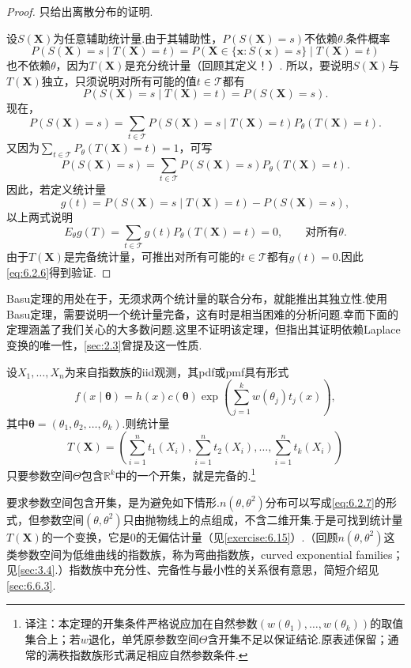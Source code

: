 \begin{proof}
只给出离散分布的证明.

设$S(\boldsymbol X)$为任意辅助统计量.由于其辅助性，$P(S(\boldsymbol X)=s)$不依赖$\theta$.条件概率
$$P(S(\boldsymbol X)=s\mid T(\boldsymbol X)=t)=P(\boldsymbol X\in\{\boldsymbol x:S(\boldsymbol x)=s\}\mid T(\boldsymbol X)=t)$$
也不依赖$\theta$，因为$T(\boldsymbol X)$是充分统计量（回顾其定义！）.
所以，要说明$S(\boldsymbol X)$与$T(\boldsymbol X)$独立，只须说明对所有可能的值$t\in\mathcal T$都有
\begin{equation}\label{eq:6.2.6}
P(S(\boldsymbol X)=s\mid T(\boldsymbol X)=t)=P(S(\boldsymbol X)=s).
\end{equation}
现在，
$$P(S(\boldsymbol X)=s)=\sum_{t\in\mathcal T}P(S(\boldsymbol X)=s\mid T(\boldsymbol X)=t)P_\theta(T(\boldsymbol X)=t).$$
又因为$\sum_{t\in\mathcal T}P_\theta(T(\boldsymbol X)=t)=1$，可写
$$P(S(\boldsymbol X)=s)=\sum_{t\in\mathcal T}P(S(\boldsymbol X)=s)P_\theta(T(\boldsymbol X)=t).$$
因此，若定义统计量
$$g(t)=P(S(\boldsymbol X)=s\mid T(\boldsymbol X)=t)-P(S(\boldsymbol X)=s),$$
以上两式说明
$$E_\theta g(T)=\sum_{t\in\mathcal T}g(t)P_\theta(T(\boldsymbol X)=t)=0,\qquad\text{对所有$\theta$}.$$
由于$T(\boldsymbol X)$是完备统计量，可推出对所有可能的$t\in\mathcal T$都有$g(t)=0$.因此\eqref{eq:6.2.6}得到验证.
\end{proof}
Basu定理的用处在于，无须求两个统计量的联合分布，就能推出其独立性.使用Basu定理，需要说明一个统计量完备，这有时是相当困难的分析问题.幸而下面的定理涵盖了我们关心的大多数问题.这里不证明该定理，但指出其证明依赖Laplace变换的唯一性，\autoref{sec:2.3}曾提及这一性质.
\begin{theorem}[指数族中的完备统计量]\label{thm:6.2.25}
设$X_1,\ldots,X_n$为来自指数族的iid观测，其pdf或pmf具有形式
\begin{equation}\label{eq:6.2.7}
f(x\mid\boldsymbol\theta)=h(x)c(\boldsymbol\theta)\exp\left(\sum_{j=1}^k w(\theta_j)t_j(x)\right),
\end{equation}
其中$\boldsymbol\theta=(\theta_1,\theta_2,\ldots,\theta_k)$.则统计量
$$T(\boldsymbol X)=\left(\sum_{i=1}^nt_1(X_i),\sum_{i=1}^nt_2(X_i),\ldots,\sum_{i=1}^nt_k(X_i)\right)$$
只要参数空间$\Theta$包含$\mathbb R^k$中的一个开集，就是完备的.\footnote{译注：本定理的开集条件严格说应加在自然参数$(w(\theta_1),\ldots,w(\theta_k))$的取值集合上；若$w$退化，单凭原参数空间$\Theta$含开集不足以保证结论.原表述保留；通常的满秩指数族形式满足相应自然参数条件.}
\end{theorem}
要求参数空间包含开集，是为避免如下情形.$n(\theta,\theta^2)$分布可以写成\eqref{eq:6.2.7}的形式，但参数空间$(\theta,\theta^2)$只由抛物线上的点组成，不含二维开集.于是可找到统计量$T(\boldsymbol X)$的一个变换，它是0的无偏估计量（见\autoref{exercise:6.15}）.（回顾$n(\theta,\theta^2)$这类参数空间为低维曲线的指数族，称为弯曲指数族，curved exponential families；见\autoref{sec:3.4}.）指数族中充分性、完备性与最小性的关系很有意思，简短介绍见\autoref{sec:6.6.3}.

